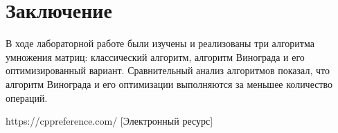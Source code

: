 \documentclass[12pt, a4paper]{report}
\begin{document}
	\chapter*{Заключение}
	В ходе лабораторной работе были изучены и реализованы три алгоритма умножения матриц: классический алгоритм, алгоритм Винограда и его оптимизированный вариант. Сравнительный анализ алгоритмов показал, что алгоритм Винограда и его оптимизации выполняются за меньшее количество операций.
	
	\newpage
	
	\begin{thebibliography}{}
		
	 https://cppreference.com/ [Электронный ресурс]
	\end{thebibliography}
\end{document}
